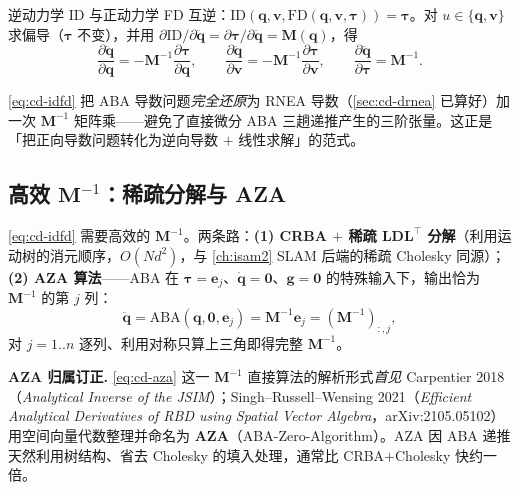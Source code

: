 \begin{theorem}\label{thm:cd-idfd}
逆动力学 ID 与正动力学 FD 互逆：$\mathrm{ID}(\mathbf q,\mathbf v,\mathrm{FD}(\mathbf q,\mathbf v,\boldsymbol\tau))=\boldsymbol\tau$。对 $u\in\{\mathbf q,\mathbf v\}$ 求偏导（$\boldsymbol\tau$ 不变），并用 $\partial\mathrm{ID}/\partial\ddot{\mathbf q}=\partial\boldsymbol\tau/\partial\ddot{\mathbf q}=\mathbf M(\mathbf q)$，得
\begin{equation}
  \boxed{\;\frac{\partial\ddot{\mathbf q}}{\partial\mathbf q}=-\mathbf M^{-1}\frac{\partial\boldsymbol\tau}{\partial\mathbf q},\qquad \frac{\partial\ddot{\mathbf q}}{\partial\mathbf v}=-\mathbf M^{-1}\frac{\partial\boldsymbol\tau}{\partial\mathbf v},\qquad \frac{\partial\ddot{\mathbf q}}{\partial\boldsymbol\tau}=\mathbf M^{-1}.\;}
  \label{eq:cd-idfd}
\end{equation}
\end{theorem}

\begin{insight}
\cref{eq:cd-idfd} 把 ABA 导数问题\emph{完全还原}为 RNEA 导数（\cref{sec:cd-drnea} 已算好）加一次 $\mathbf M^{-1}$ 矩阵乘——避免了直接微分 ABA 三趟递推产生的三阶张量。这正是「把正向导数问题转化为逆向导数 $+$ 线性求解」的范式。
\end{insight}

\subsection{高效 \texorpdfstring{$\mathbf M^{-1}$}{Minv}：稀疏分解与 AZA}
\cref{eq:cd-idfd} 需要高效的 $\mathbf M^{-1}$。两条路：\textbf{(1) CRBA $+$ 稀疏 $\mathbf L\mathbf D\mathbf L^\top$ 分解}（利用运动树的消元顺序，$O(Nd^2)$，与 \cref{ch:isam2} SLAM 后端的稀疏 Cholesky 同源）；\textbf{(2) AZA 算法}——ABA 在 $\boldsymbol\tau=\mathbf e_j$、$\dot{\mathbf q}=\mathbf 0$、$\mathbf g=\mathbf 0$ 的特殊输入下，输出恰为 $\mathbf M^{-1}$ 的第 $j$ 列：
\begin{equation}
  \ddot{\mathbf q}=\mathrm{ABA}(\mathbf q,\mathbf 0,\mathbf e_j)=\mathbf M^{-1}\mathbf e_j=(\mathbf M^{-1})_{:,j},
  \label{eq:cd-aza}
\end{equation}
对 $j=1..n$ 逐列、利用对称只算上三角即得完整 $\mathbf M^{-1}$。

\begin{note}
\textbf{AZA 归属订正.}\;
\cref{eq:cd-aza} 这一 $\mathbf M^{-1}$ 直接算法的解析形式\emph{首见} Carpentier 2018（\emph{Analytical Inverse of the JSIM}）\cite{carpentier2018inverse}；Singh--Russell--Wensing 2021（\emph{Efficient Analytical Derivatives of RBD using Spatial Vector Algebra}，arXiv:2105.05102）\cite{singh2021efficient} 用空间向量代数整理并命名为 \textbf{AZA}（ABA-Zero-Algorithm）。AZA 因 ABA 递推天然利用树结构、省去 Cholesky 的填入处理，通常比 CRBA$+$Cholesky 快约一倍。
\end{note}


